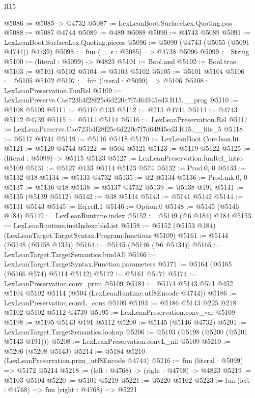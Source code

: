 \begin{lexlean}{R15}
\begin{coremodule}
{{{{{{{{{{{@5086 := @5085 -> @4732
@5087 := LexLeanBoot.SurfaceLex.Quoting.pos
@5088 := @5087 @4744
@5089 := @489 @5088
@5090 := @4743 @5089
@5091 := LexLeanBoot.SurfaceLex.Quoting.pieces
@5096 := @5090 (@4743 (@5055 (@5091 @4744)) @4739)
@5098 := fun (__s : @5085) => @4738 @5096
@5099 := String
@5100 := (literal : @5099) -> @4823
@5101 := Bool.and
@5102 := Bool.true
@5103 := @5101 @5102
@5104 := @5103 @5102
@5105 := @5101 @5104
@5106 := @5105 @5102
@5107 := fun (literal : @5099) => @5106
@5108 := LexLeanPreservation.FunRel
@5109 := LexLeanPreserve.Cae723b4f28f25c6d220e7f7d64945ed3.R15.__prog
@5110 := @5108 @5109
@5111 := @5110 @133
@5112 := @213 @4744
@5114 := @4743 @5112 @4739
@5115 := @5111 @5114
@5116 := LexLeanPreservation.Rel
@5117 := LexLeanPreserve.Cae723b4f28f25c6d220e7f7d64945ed3.R15.__fits_5
@5118 := @5117 @4744
@5119 := @5116 @5118
@5120 := LexLeanBoot.CoreJson.lit
@5121 := @5120 @4744
@5122 := @504 @5121
@5123 := @5119 @5122
@5125 := (literal : @5099) -> @5115 @5123
@5127 := LexLeanPreservation.funRel_intro @5109
@5131 := @5127 @133 @5114 @5123 @574
@5132 := Prod.{0, 0}
@5133 := @5132 @18
@5134 := @5133 @4732
@5135 := @2 @5134
@5136 := Prod.mk.{0, 0}
@5137 := @5136 @18
@5138 := @5137 @4732
@5139 := @5138 @191
@5141 := @5135 (@5139 @5112)
@5142 := @38 @5134
@5143 := @5141 @5142
@5144 := @5131 @5143
@5145 := Eq.refl.{1}
@5146 := Option.{0}
@5148 := @5145 (@5146 @184)
@5149 := LexLeanRuntime.index
@5152 := @5149 (@6 @184) @184
@5153 := LexLeanRuntime.instIndexableList
@5158 := @5152 (@5153 @184) (LexLeanTarget.TargetSyntax.Program.functions @5109)
@5161 := @5144 (@5148 (@5158 @133))
@5164 := @5145 (@5146 (@6 @5134))
@5165 := LexLeanTarget.TargetSemantics.bindAll
@5166 := LexLeanTarget.TargetSyntax.Function.parameters
@5171 := @5164 (@5165 (@5166 @574) @5114 @5142)
@5172 := @5161 @5171
@5174 := LexLeanPreservation.conv_prim @5109
@5184 := @5174 @5143 @571 @452 @5104 @5102 @5114 (@504 (LexLeanRuntime.utf8Encode @4744))
@5186 := LexLeanPreservation.convL_cons @5109
@5193 := @5186 @5143 @225 @218 @5102 @5102 @5112 @4739
@5195 := LexLeanPreservation.conv_var @5109
@5198 := @5195 @5143 @191 @5112
@5200 := @5145 (@5146 @4732)
@5201 := LexLeanTarget.TargetSemantics.lookup
@5206 := @5193 (@5198 (@5200 (@5201 @5143 @191)))
@5208 := LexLeanPreservation.convL_nil @5109
@5210 := @5206 (@5208 @5143)
@5214 := @5184 @5210 (LexLeanPreservation.prim_utf8Encode @4744)
@5216 := fun (literal : @5099) => @5172 @5214
@5218 := (left : @4768) -> (right : @4768) -> @4823
@5219 := @5103 @5104
@5220 := @5101 @5219
@5221 := @5220 @5102
@5223 := fun (left : @4768) => fun (right : @4768) => @5221
}}}}}}}}}}}
\end{coremodule}
\end{lexlean}
